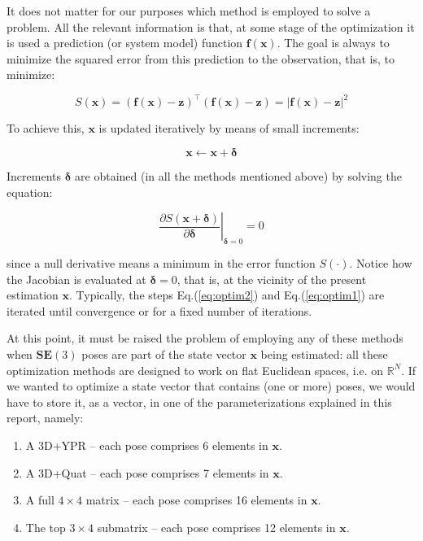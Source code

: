 \documentclass[a4paper,11pt]{report}
\newcommand{\DEL}{{\bm{\delta}}}
\begin{document}
It does not matter for our purposes which method is employed to solve a problem.
All the relevant information is that, at some stage of the optimization
it is used a prediction (or system model) function
$\mathbf{f}(\mathbf{x})$.
The goal is always to minimize the squared error from
this prediction to the observation, that is,
to minimize:

\begin{equation}
S(\mathbf{x}) = (\mathbf{f}(\mathbf{x})-\mathbf{z})^\top (\mathbf{f}(\mathbf{x})-\mathbf{z})
 = | \mathbf{f}(\mathbf{x})-\mathbf{z} |^2
\end{equation}

To achieve this, $\mathbf{x}$ is updated iteratively by means of small increments:

\begin{equation}
\label{eq:optim1}
 \mathbf{x}  \leftarrow \mathbf{x} + \DEL
\end{equation}

Increments $\DEL$ are obtained
(in all the methods mentioned above)
by solving the equation:

\begin{equation}
\label{eq:optim2}
\left. \frac{\partial S(\mathbf{x} + \DEL )}{\partial \DEL }
\right|_{\DEL=0}
= 0
\end{equation}

\noindent since a null derivative means a minimum in the error function $S(\cdot)$.
Notice how the Jacobian is evaluated at $\DEL=0$, that is, at the vicinity of
the present estimation $\mathbf{x}$.
Typically, the steps Eq.(\ref{eq:optim2}) and Eq.(\ref{eq:optim1}) are
iterated until convergence or for a fixed number of iterations.

At this point, it must be raised the problem of employing any of
these methods when $\mathbf{SE}(3)$ poses
are part of the state vector $\mathbf{x}$ being estimated:
all these optimization methods are designed to work on flat Euclidean spaces, i.e. on $\mathbb{R}^N$.
If we wanted to optimize a state vector that contains (one or more) poses,
we would have to store it, as a vector, in one of the parameterizations explained in this report, namely:

\begin{enumerate}
 \item A 3D+YPR -- each pose comprises 6 elements in $\mathbf{x}$.
 \item A 3D+Quat -- each pose comprises 7 elements in $\mathbf{x}$.
 \item A full $4\times 4$ matrix -- each pose comprises 16 elements in $\mathbf{x}$.
 \item The top $3\times 4$ submatrix -- each pose comprises 12 elements in $\mathbf{x}$.
\end{enumerate}
\end{document}

